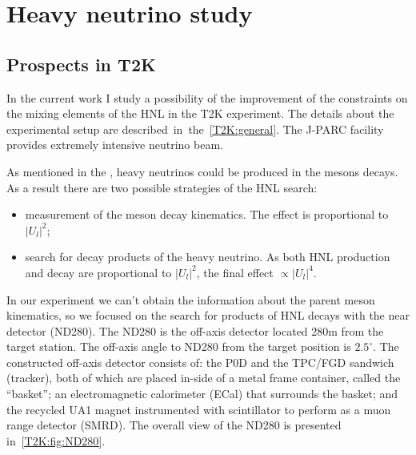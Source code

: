 \documentclass[../main.tex]{subfiles}
\begin{document}
\renewcommand{\labelitemi}{\ding{226}}
\renewcommand{\labelitemii}{\ding{227}}

\part{Heavy neutrino study}

\chapter{Prospects in T2K}

In the current work I study a possibility of the improvement of the constraints on the mixing elements of the HNL in the T2K experiment. The details about the experimental setup are described~in~the~\autoref{T2K:general}. The J-PARC facility provides extremely intensive neutrino beam.

As mentioned in the , heavy neutrinos could be produced in the mesons decays. As a result there are two possible strategies of the HNL search:
\begin{itemize}
    \item measurement of the meson decay kinematics. The effect is proportional to $\left|U_l\right|^2$;
    \item search for decay products of the heavy neutrino. As both HNL production and decay are proportional to $\left|U_l\right|^2$, the final effect $\propto\left|U_l\right|^4$.
\end{itemize}

In our experiment we can't obtain the information about the parent meson kinematics, so we focused on the search for products of HNL decays with the near detector (ND280). The ND280 is the off-axis detector located 280m from the target station. The off-axis angle to ND280 from the target position is $2.5^\circ$. The constructed off-axis detector consists of: the P0D and the TPC/FGD sandwich (tracker), both of which are placed in-side of a metal frame container, called the “basket”; an electromagnetic calorimeter (ECal) that surrounds the basket; and the recycled UA1 magnet instrumented with scintillator to perform as a muon range detector (SMRD). The overall view of the ND280 is presented in~\autoref{T2K:fig:ND280}.
\end{document}
